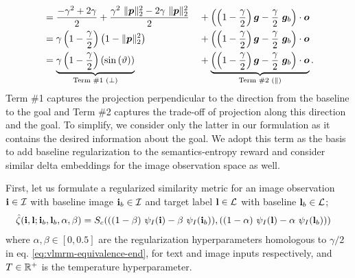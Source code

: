 \begin{align}
    &= \dfrac{-\gamma^2 + 2\gamma}{2} + \dfrac{\gamma^2\ \norm{\bmp}^2_2 - 2 \gamma\ \norm{\bmp}^2_2}{2} &&+ \left(\left(1 - \dfrac{\gamma}{2}\right) \bmg - \dfrac{\gamma}{2}\ \bmg_b\right) \cdot \bmo\\ %
    &= \gamma\left(1 - \dfrac{\gamma}{2}\right)\left(1 -\norm{\bmp}^2_2\right) &&+ \left(\left(1 - \dfrac{\gamma}{2}\right) \bmg - \dfrac{\gamma}{2}\ \bmg_b\right) \cdot \bmo\\
    &= \underbrace{\gamma\left(1 - \dfrac{\gamma}{2}\right)\left(\sin\left(\vartheta\right)\right)}_{\text{Term \#1 (\(\perp\))}} &&+ \underbrace{\left(\left(1 - \dfrac{\gamma}{2}\right) \bmg - \dfrac{\gamma}{2}\ \bmg_b\right) \cdot \bmo}_{\text{Term \#2 (\(\parallel\))}}.
    \label{eq:vlmrm-equivalence-end}
\end{align}
Term \#1 captures the projection perpendicular to the direction from the baseline to the goal and Term \#2 captures the trade-off of projection along this direction and the goal.
To simplify, we consider only the latter in our formulation as it contains the desired information about the goal.
We adopt this term as the basis to add baseline regularization to the semantics-entropy reward and consider similar delta embeddings for the image observation space as well.

First, let us formulate a regularized similarity metric for an image observation \(\mathbf{i} \in \mathcal{I}\) with baseline image \(\mathbf{i}_b \in \mathcal{I}\) and target label \(\mathbf{l} \in \mathcal{L}\) with baseline \(\mathbf{l}_b \in \mathcal{L}\);
\begin{equation}
    \label{eq:clip-similarity-reg}
    \begin{split}
        \hat{\zeta}(\mathbf{i}, \mathbf{l}; \mathbf{i}_b, \mathbf{l}_b, \alpha, \beta)
        &= S_c(
            ((1 - \beta)\ \psi_I(\mathbf{i}) - \beta\ \psi_I(\mathbf{i}_b)),
            ((1 - \alpha)\ \psi_I(\mathbf{l}) - \alpha\ \psi_I(\mathbf{l}_b))
        )
    \end{split}
\end{equation}
where \(\alpha, \beta \in [0, 0.5]\) are the regularization hyperparameters homologous to \(\gamma / 2\) in eq. \eqref{eq:vlmrm-equivalence-end}, for text and image inputs respectively, and \(T \in \mathbb{R}^+\) is the temperature hyperparameter.

